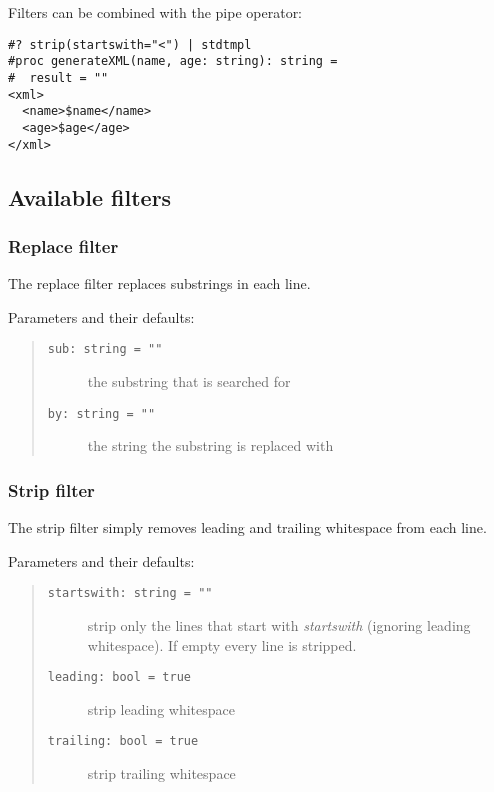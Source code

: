 Filters can be combined with the \texttt{\textbar{}} pipe operator:

\begin{verbatim}
#? strip(startswith="<") | stdtmpl
#proc generateXML(name, age: string): string =
#  result = ""
<xml>
  <name>$name</name>
  <age>$age</age>
</xml>
\end{verbatim}

\hypertarget{available-filters}{%
\subsection{Available filters}\label{available-filters}}

\hypertarget{replace-filter}{%
\subsubsection{Replace filter}\label{replace-filter}}

The replace filter replaces substrings in each line.

Parameters and their defaults:

\begin{quote}
\begin{description}
\item[\texttt{sub:\ string\ =\ ""}]
the substring that is searched for
\item[\texttt{by:\ string\ =\ ""}]
the string the substring is replaced with
\end{description}
\end{quote}

\hypertarget{strip-filter}{%
\subsubsection{Strip filter}\label{strip-filter}}

The strip filter simply removes leading and trailing whitespace from
each line.

Parameters and their defaults:

\begin{quote}
\begin{description}
\item[\texttt{startswith:\ string\ =\ ""}]
strip only the lines that start with \emph{startswith} (ignoring leading
whitespace). If empty every line is stripped.
\item[\texttt{leading:\ bool\ =\ true}]
strip leading whitespace
\item[\texttt{trailing:\ bool\ =\ true}]
strip trailing whitespace
\end{description}
\end{quote}

